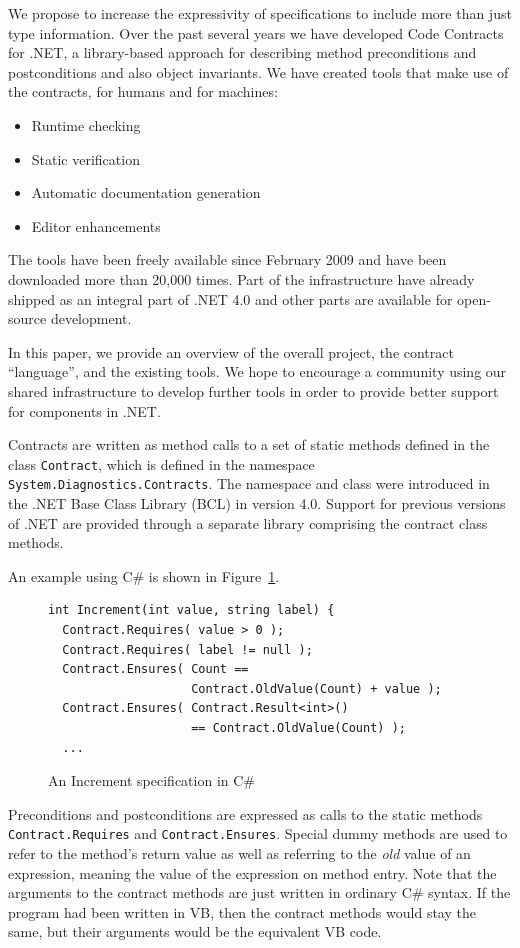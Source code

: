 \documentclass[10pt,twocolumn]{article}
\newcommand{\csharp}{C{\normalfont \#}}
\begin{document}
We propose to increase the expressivity of specifications to include
more than just type information.
Over the past several years we have developed Code Contracts for .NET, a
library-based approach for describing method preconditions and postconditions
and also object invariants.
We have created tools that make use of the contracts, for humans and for
machines:
\begin{itemize}
\item Runtime checking
\item Static verification
\item Automatic documentation generation
\item Editor enhancements
\end{itemize}
The tools have been freely available since February 2009 and have been downloaded more than 20,000 times.
Part of the infrastructure have already shipped as an integral part of .NET 4.0 and other parts
are available for open-source development.

In this paper, we provide an overview of the overall project, the contract ``language'', and
the existing tools.
We hope to encourage a community using our shared infrastructure to develop further
tools in order to provide better support for components in .NET.

Contracts are written as method calls to a set of static methods defined
in the class {\tt Contract}, which is defined in the namespace {\tt System.Diagnostics.Contracts}.
The namespace and class were introduced in the .NET Base Class Library (BCL)
in version 4.0.
Support for previous versions of .NET are provided through a separate library
comprising the contract class methods.

An example using \csharp{} is shown in Figure~\ref{fig:csharp}.
\begin{figure}[thb]
\begin{small}
\begin{lstlisting}
int Increment(int value, string label) {
  Contract.Requires( value > 0 );
  Contract.Requires( label != null );
  Contract.Ensures( Count == 
                    Contract.OldValue(Count) + value );
  Contract.Ensures( Contract.Result<int>()
                    == Contract.OldValue(Count) );
  ...
\end{lstlisting}
\caption{An Increment specification in \csharp}
\label{fig:csharp}
\end{small}
\end{figure}
Preconditions and postconditions are expressed as calls to the static
methods \lstinline{Contract.Requires} and
\lstinline{Contract.Ensures}. Special dummy methods are used to refer
to the method's return value as well as referring to the \emph{old}
value of an expression, meaning the value of the expression on method
entry.
Note that the arguments to the contract methods are just written in
ordinary \csharp{} syntax.
If the program had been written in VB, then the contract methods would
stay the same, but their arguments would be the equivalent VB code.
\end{document}
